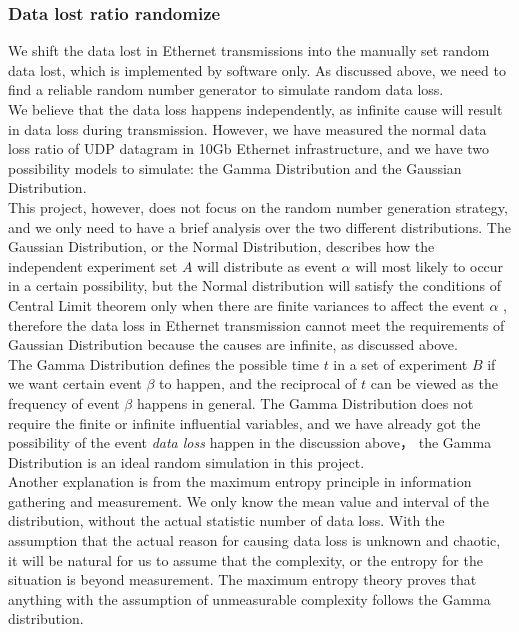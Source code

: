 \documentclass[11pt,openright,a4paper]{report}
\begin{document}
\subsubsection{Data lost ratio randomize}
We shift the data lost in Ethernet transmissions into the manually set random data lost, which is implemented by software only. As discussed above, we need to find a reliable random number generator to simulate random data loss.\\
We believe that the data loss happens independently, as infinite cause will result in data loss during transmission. However, we have measured the normal data loss ratio of UDP datagram in 10Gb Ethernet infrastructure, and we have two possibility models to simulate: the Gamma Distribution and the Gaussian Distribution\cite{dubois2006possibility}.\\
This project, however, does not focus on the random number generation strategy, and we only need to have a brief analysis over the two different distributions. The Gaussian Distribution, or the Normal Distribution, describes how the independent experiment set $A$ will distribute as event $\alpha$ will most likely to occur in a certain possibility\cite{morrison1990multivariate}, but the Normal distribution will satisfy the conditions of Central Limit theorem only when there are finite variances to affect the event $\alpha$ \cite{rosenblatt1956central}, therefore the data loss in Ethernet transmission cannot meet the requirements of Gaussian Distribution because the causes are infinite, as discussed above.\\
The Gamma Distribution defines the possible time $t$ in a set of experiment $B$ if we want certain event $\beta$ to happen, and the reciprocal of $t$ can be viewed as the frequency of event $\beta$ happens in general\cite{stacy1962generalization}. The Gamma Distribution does not require the finite or infinite influential variables, and we have already got the possibility of the event \textit{data loss} happen in the discussion above， the Gamma Distribution is an ideal random simulation in this project.\\
Another explanation is from the maximum entropy principle in information gathering and measurement\cite{kapur1994measures}. We only know the mean value and interval of the distribution, without the actual statistic number of data loss. With the assumption that the actual reason for causing data loss is unknown and chaotic, it will be natural for us to assume that the complexity, or the entropy for the situation is beyond measurement. The maximum entropy theory proves that anything with the assumption of unmeasurable complexity follows the Gamma distribution\cite{balasubramanian1984maximum}.
\end{document}

